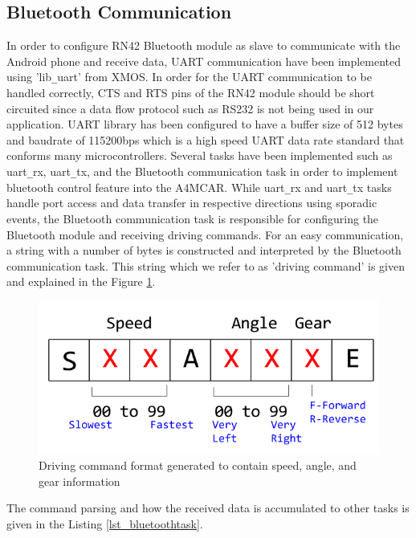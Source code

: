 \subsection{Bluetooth Communication}
In order to configure RN42 Bluetooth module \cite{rn42datasheet} as slave to communicate with the Android phone and receive data, UART communication have been implemented using 'lib\texttt{\_}uart' from XMOS. In order for the UART communication to be handled correctly, CTS and RTS pins of the RN42 module should be short circuited since a data flow protocol such as RS232 is not being used in our application. UART library has been configured to have a buffer size of 512 bytes and baudrate of 115200bps which is a high speed UART data rate standard that conforms many microcontrollers. Several tasks have been implemented such as uart\texttt{\_}rx, uart\texttt{\_}tx, and the Bluetooth communication task in order to implement bluetooth control feature into the A4MCAR. While uart\texttt{\_}rx and uart\texttt{\_}tx tasks handle port access and data transfer in respective directions using sporadic events, the Bluetooth communication task is responsible for configuring the Bluetooth module and receiving driving commands. For an easy communication, a string with a number of bytes is constructed and interpreted by the Bluetooth communication task. This string which we refer to as 'driving command' is given and explained in the Figure \ref{fig:bluetoothcommand}. 
\begin{figure}[!ht]
	\centering
	\captionsetup{justification=centering}
	\includegraphics[scale=0.6]{content/images/bluetoothcommand.png}
	\caption{Driving command format generated to contain speed, angle, and gear information}
	\label{fig:bluetoothcommand}
\end{figure}
The command parsing and how the received data is accumulated to other tasks is given in the Listing \ref{lst_bluetoothtask}. 

